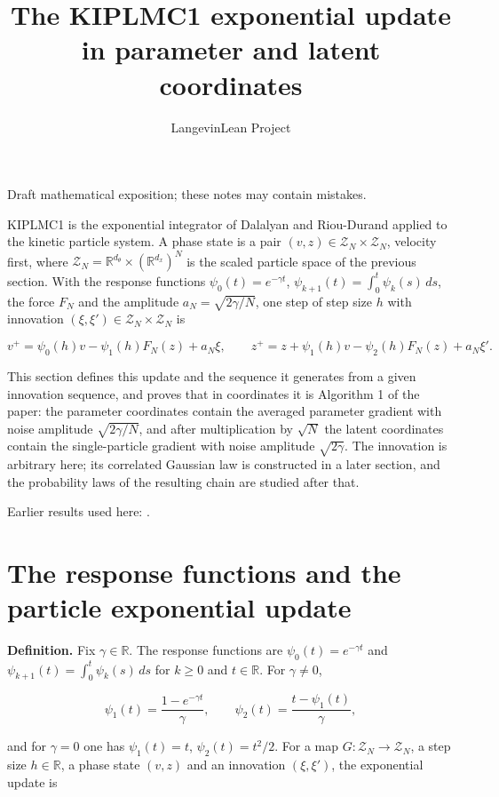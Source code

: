 \documentclass[11pt,a4paper]{article}
\title{\texorpdfstring{The KIPLMC1 exponential update in parameter and latent coordinates}{The KIPLMC1 exponential update in parameter and latent coordinates}}
\author{LangevinLean Project}
\date{}
\begin{document}
\maketitle
Draft mathematical exposition; these notes may contain mistakes.


KIPLMC1 is the exponential integrator of Dalalyan and Riou-Durand applied to the kinetic particle system. A phase state is a pair \((v,z)\in\mathcal Z_N\times\mathcal Z_N\), velocity first, where \(\mathcal Z_N=\mathbb R^{d_\theta}\times(\mathbb R^{d_x})^N\) is the scaled particle space of the previous section. With the response functions \(\psi_0(t)=e^{-\gamma t}\), \(\psi_{k+1}(t)=\int_0^t\psi_k(s)\,ds\), the force \(F_N\) and the amplitude \(a_N=\sqrt{2\gamma/N}\), one step of step size \(h\) with innovation \((\xi,\xi')\in\mathcal Z_N\times\mathcal Z_N\) is


\[v^+=\psi_0(h)v-\psi_1(h)F_N(z)+a_N\xi,\qquad z^+=z+\psi_1(h)v-\psi_2(h)F_N(z)+a_N\xi'.\]


This section defines this update and the sequence it generates from a given innovation sequence, and proves that in coordinates it is Algorithm 1 of the paper: the parameter coordinates contain the averaged parameter gradient with noise amplitude \(\sqrt{2\gamma/N}\), and after multiplication by \(\sqrt N\) the latent coordinates contain the single-particle gradient with noise amplitude \(\sqrt{2\gamma}\). The innovation is arbitrary here; its correlated Gaussian law is constructed in a later section, and the probability laws of the resulting chain are studied after that.



Earlier results used here: \cite[Section~3.12]{LangevinLean2026Kinetic}.

\section{\texorpdfstring{The response functions and the particle exponential update}{The response functions and the particle exponential update}}


\textbf{Definition.} Fix \(\gamma\in\mathbb R\). The response functions are \(\psi_0(t)=e^{-\gamma t}\) and \(\psi_{k+1}(t)=\int_0^t\psi_k(s)\,ds\) for \(k\ge0\) and \(t\in\mathbb R\). For \(\gamma\ne0\),


\[\psi_1(t)=\frac{1-e^{-\gamma t}}{\gamma},\qquad\psi_2(t)=\frac{t-\psi_1(t)}{\gamma},\]


and for \(\gamma=0\) one has \(\psi_1(t)=t\), \(\psi_2(t)=t^2/2\). For a map \(G:\mathcal Z_N\to\mathcal Z_N\), a step size \(h\in\mathbb R\), a phase state \((v,z)\) and an innovation \((\xi,\xi')\), the exponential update is
\end{document}

